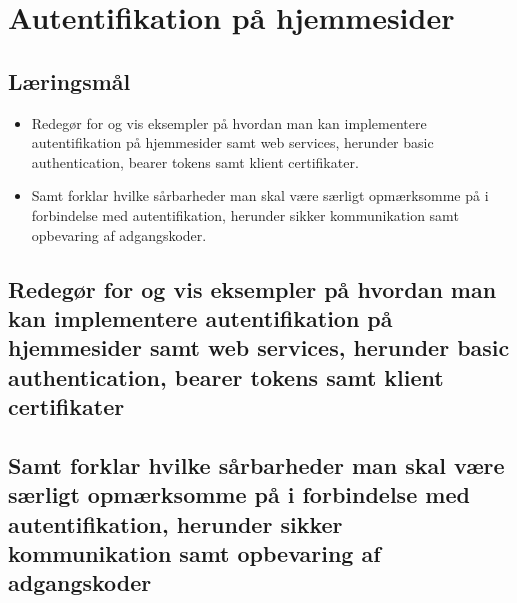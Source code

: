 \section{Autentifikation på hjemmesider}

\subsection{Læringsmål}

\begin{itemize}
	\item Redegør for og vis eksempler på hvordan man kan implementere autentifikation på
	hjemmesider samt web services, herunder basic authentication, bearer tokens samt
	klient certifikater.
	\item Samt forklar hvilke sårbarheder man skal være særligt opmærksomme på i
	forbindelse med autentifikation, herunder sikker kommunikation samt opbevaring
	af adgangskoder.
\end{itemize}

\subsection{Redegør for og vis eksempler på hvordan man kan implementere autentifikation på	hjemmesider samt web services, herunder basic authentication, bearer tokens samt klient certifikater}
\subsection{Samt forklar hvilke sårbarheder man skal være særligt opmærksomme på i forbindelse med autentifikation, herunder sikker kommunikation samt opbevaring af adgangskoder}

